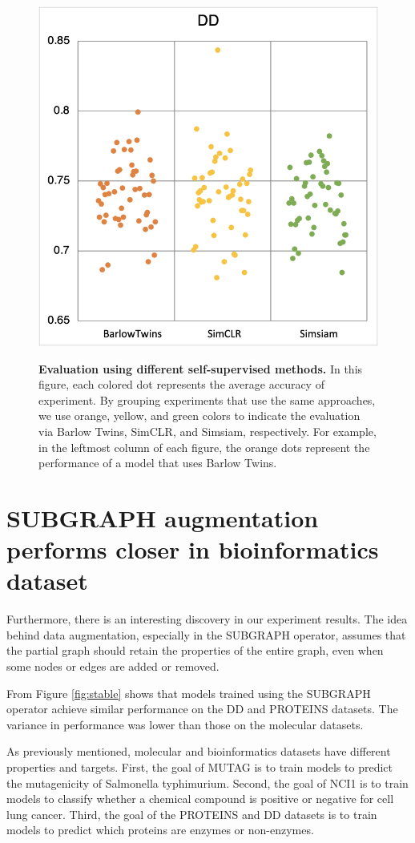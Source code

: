 \begin{figure}
{        %
        \includegraphics[width = .48\linewidth]{./figures/1-DD.png}}
\vspace{0.5cm}
\caption[Evaluation using different self-supervised methods]{\textbf{Evaluation using different self-supervised methods.} In this figure, each colored dot represents the average accuracy of experiment. By grouping experiments that use the same approaches, we use orange, yellow, and green colors to indicate the evaluation via Barlow Twins, SimCLR, and Simsiam, respectively. For example, in the leftmost column of each figure, the orange dots represent the performance of a model that uses Barlow Twins.}
\label{fig:simclrbetter}
\end{figure}



\section{SUBGRAPH augmentation performs closer in bioinformatics dataset}

Furthermore, there is an interesting discovery in our experiment results. The idea behind data augmentation, especially in the SUBGRAPH operator, assumes that the partial graph should retain the properties of the entire graph, even when some nodes or edges are added or removed.  

From Figure \ref{fig:stable} shows that models trained using the SUBGRAPH operator achieve similar performance on the DD and PROTEINS datasets. The variance in performance was lower than those on the molecular datasets.

As previously mentioned, molecular and bioinformatics datasets have different properties and targets. First, the goal of MUTAG is to train models to predict the mutagenicity of Salmonella typhimurium. Second, the goal of NCI1 is to train models to classify whether a chemical compound is positive or negative for cell lung cancer. Third, the goal of the PROTEINS and DD datasets is to train models to predict which proteins are enzymes or non-enzymes.

